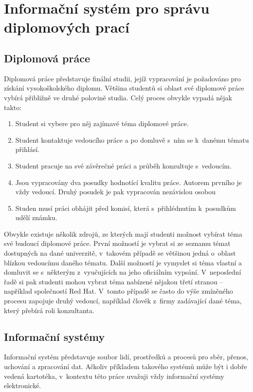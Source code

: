 \chapter{Informační systém pro správu diplomových prací}

\section{Diplomová práce}
Diplomová práce představuje finální studii, jejíž vypracování je požadováno pro získání vysokoškolského diplomu. Většina studentů si oblast své diplomové práce vybírá přibližně ve druhé polovině studia. Celý proces obvykle vypadá nějak takto:
\begin{enumerate}
    \item Student si vybere pro něj zajímavé téma diplomové práce.
    \item Student kontaktuje vedoucího práce a po domluvě s~ním se k~danému tématu přihlásí.
    \item Student pracuje na své závěrečné práci a průběh konzultuje s~vedoucím.
    \item Jsou vypracovány dva posudky hodnotící kvalitu práce. Autorem prvního je vždy vedoucí. Druhý posudek je pak vypracován nezávislou osobou
    \item Studen musí práci obhájit před komisí, která s~přihlédnutím k~posudkům udělí známku.
\end{enumerate}

Obvykle existuje několik zdrojů, ze kterých mají studenti možnost vybírat téma své budoucí diplomové práce. První možností je vybrat si ze seznamu témat dostupných na dané univerzitě, v~takovém případě se většinou jedná o~oblast blízkou vedoucímu daného tématu. Další možností je vymyslet si téma vlastní a domluvit se s~některým z~vyučujících na jeho oficiálním vypsání. V~neposlední řadě si pak studenti mohou vybrat téma nabízené nějakou třetí stranou -- například společností Red Hat. V~tomto případě se často do výše zmíněného procesu zapojuje druhý vedoucí, například člověk z~firmy zadávající dané téma, který přebírá roli konzultanta.

\section{Informační systémy}
Informační systém představuje soubor lidí, prostředků a procesů pro sběr, přenos, uchování a zpracování dat\cite{is-intro}. Ačkoliv příkladem takového systémů může být i dobře vedená kartotéka, v~kontextu této práce uvažuji vždy informační systémy elektronické.


